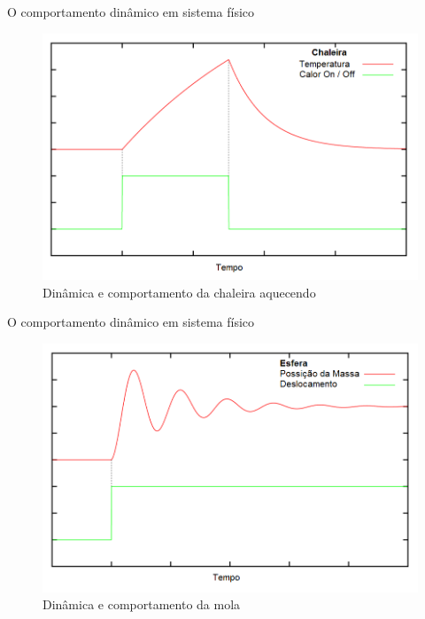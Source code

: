 \begin{frame}{O comportamento dinâmico em sistema físico}
	\begin{figure}[htb]
		\centering
		\includegraphics[scale=0.4]{../monograph/images/grafico-chaleira.png}	
		\caption{Dinâmica e comportamento da chaleira aquecendo \cite{Janert2013}}
	\end{figure}
\end{frame}

\begin{frame}{O comportamento dinâmico em sistema físico}
	\begin{figure}[htb]
		\centering
		\includegraphics[scale=0.4]{../monograph/images/grafico-mola.png}	
		\caption{Dinâmica e comportamento da mola \cite{Janert2013}}
	\end{figure}
\end{frame}

